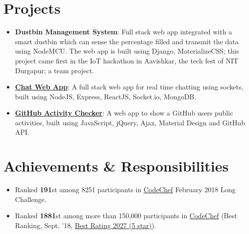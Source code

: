 \documentclass[a4paper,11pt]{article}
\newcommand{\resumeItemListStart}{\begin{itemize}}
\newcommand{\resumeItemListEnd}{\end{itemize}\vspace{-5pt}}
\begin{document}
\section{Projects}
      \setlength{\itemsep}{0.5pt}
      \begin{itemize}
        \item\textbf{Dustbin Management System}{: Full stack web app integrated with a smart dustbin which can sense the percentage filled and transmit the data using NodeMCU. The web app is built using Django, MaterializeCSS; this project came first in the IoT hackathon in Aavishkar, the tech
        fest of NIT Durgapur; a team project.}
        \item\textbf{\href{https://github.com/ayan-b/chat-web-app}{Chat Web App}}{: A full stack web app for real time chatting using sockets, built using NodeJS, Express, ReactJS, Socket.io, MongoDB.}
        \item\textbf{\href{https://github.com/ayan-b/GitHub-Activity-Checker}{GitHub Activity Checker}}{: A web app to show a GitHub user\textsc{}s public activities, built using JavaScript, jQuery, Ajax, Material Design and GitHub API.}
      \end{itemize}
  
\section{Achievements \& Responsibilities}
    \resumeItemListStart
     \setlength{\itemsep}{0.5pt}
      \item
        {Ranked \textbf{191}st among 8251 participants in \href{https://www.codechef.com/rankings/FEB18?filterBy=Institution\%3DNational\%20Institute\%20of\%20Technology\%2C\%20Durgapur&order=asc&sortBy=rank}{CodeChef} February 2018 Long Challenge.}
      \item
        {Ranked \textbf{1881}st among more than 150,000 participants in \href{https://codechef.com/users/ayan_nitd}{CodeChef} (Best Ranking, Sept, '18, \href{https://www.codechef.com/users/ayan_nitd}{Best Rating 2027 (5 star)}).}
    \resumeItemListEnd
\end{document}
